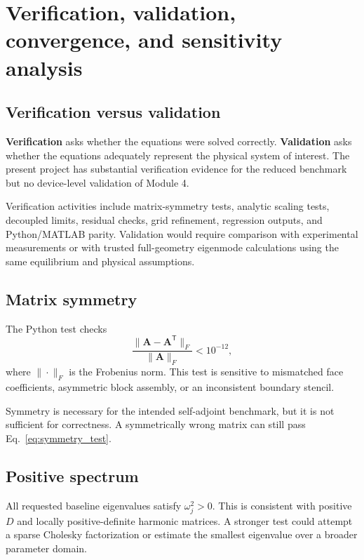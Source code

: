 \section{Verification, validation, convergence, and sensitivity analysis}
\label{sec:v_and_v}

\subsection{Verification versus validation}
\textbf{Verification} asks whether the equations were solved correctly. \textbf{Validation} asks whether the equations adequately represent the physical system of interest. The present project has substantial verification evidence for the reduced benchmark but no device-level validation of Module 4.

Verification activities include matrix-symmetry tests, analytic scaling tests, decoupled limits, residual checks, grid refinement, regression outputs, and Python/MATLAB parity. Validation would require comparison with experimental measurements or with trusted full-geometry eigenmode calculations using the same equilibrium and physical assumptions.

\subsection{Matrix symmetry}
The Python test checks
\begin{equation}
\frac{\|\mathbf A-\mathbf A^{\mathsf T}\|_F}{\|\mathbf A\|_F}<10^{-12},
\label{eq:symmetry_test}
\end{equation}
where $\|\cdot\|_F$ is the Frobenius norm. This test is sensitive to mismatched face coefficients, asymmetric block assembly, or an inconsistent boundary stencil.

Symmetry is necessary for the intended self-adjoint benchmark, but it is not sufficient for correctness. A symmetrically wrong matrix can still pass Eq.~\eqref{eq:symmetry_test}.

\subsection{Positive spectrum}
All requested baseline eigenvalues satisfy $\omega_j^2>0$. This is consistent with positive $D$ and locally positive-definite harmonic matrices. A stronger test could attempt a sparse Cholesky factorization or estimate the smallest eigenvalue over a broader parameter domain.

